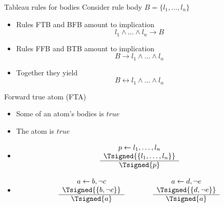 \begin{frame}{Tableau rules for bodies}
Consider rule body $B=\{l_1,\dots,l_n\}$
\bigskip
\begin{itemize}
\item<1-> Rules FTB and BFB amount to implication
  \[
  l_1 \wedge \dots \wedge l_n \rightarrow B
  \]
\item<2-> Rules FFB and BTB amount to implication
  \[
  B \rightarrow l_1 \wedge \dots \wedge l_n
  \]
\item<3-> Together they yield
  \[
  B \leftrightarrow l_1 \wedge \dots \wedge l_n
  \]
\end{itemize}
\end{frame}
\begin{frame}{Forward true atom (FTA)}
\begin{itemize}
\item {} Some of an atom's bodies is $\mathit{true}$
\item {} The atom is $\mathit{true}$
\item {}
\[
\begin{array}{c}
p \leftarrow l_1,\dots,l_n \\
\Tsigned{\{l_1,\dots,l_n\}} \\\hline
\Tsigned{p}
\end{array}
\]
\item<2-> 
\[
\begin{array}{c}
a \leftarrow b, \neg c \\
\Tsigned{\{b, \neg c\}} \\\hline
\Tsigned{a}
\end{array}
\qquad\qquad
\begin{array}{c}
a \leftarrow d, \neg e \\
\Tsigned{\{d, \neg e\}} \\\hline
\Tsigned{a}
\end{array}
\hfill
\]
\end{itemize}
\end{frame}
